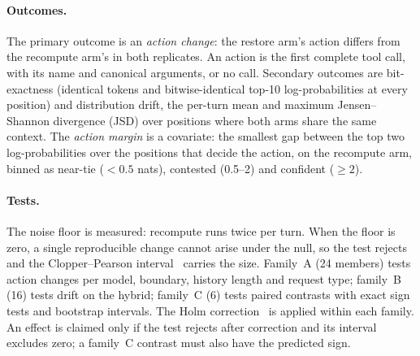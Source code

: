 \paragraph{Outcomes.}
The primary outcome is an \emph{action change}: the restore arm's action differs
from the recompute arm's in both replicates. An action is the first complete
tool call, with its name and canonical arguments, or no call. Secondary outcomes
are bit-exactness (identical tokens and bitwise-identical top-10
log-probabilities at every position) and distribution drift, the per-turn mean
and maximum Jensen--Shannon divergence (JSD) over positions where both arms
share the same context. The \emph{action margin} is a covariate: the smallest
gap between the top two log-probabilities over the positions that decide the
action, on the recompute arm, binned as near-tie ($<0.5$ nats), contested
(0.5--2) and confident ($\geq 2$).

\paragraph{Tests.}
The noise floor is measured: recompute runs twice per turn. When the floor is
zero, a single reproducible change cannot arise under the null, so the test
rejects and the Clopper--Pearson interval~\cite{clopper-pearson} carries the
size. Family~A (24 members) tests action changes per model, boundary, history
length and request type; family~B (16) tests drift on the hybrid; family~C (6)
tests paired contrasts with exact sign tests and bootstrap intervals. The Holm
correction~\cite{holm} is applied within each family. An effect is claimed only
if the test rejects after correction and its interval excludes zero; a
family~C contrast must also have the predicted sign.
